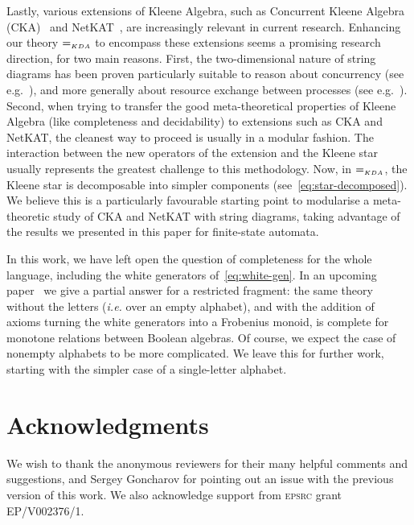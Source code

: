 \documentclass{lmcs}
\theoremstyle{plain}\newtheorem{satz}[thm]{Satz} %
\begin{document}
Lastly, various extensions of Kleene Algebra, such as Concurrent Kleene Algebra (CKA)~\cite{hoare2009concurrent,KappeB0Z18} and NetKAT~\cite{anderson2014netkat}, are increasingly relevant in current research. Enhancing our theory $=_{\scriptscriptstyle KDA}$ to encompass these extensions seems a promising research direction, for two main reasons. First, the two-dimensional nature of string diagrams  has been proven particularly suitable to reason about  concurrency (see e.g.~\cite{BonchiHPSZ19,Bruni2013}), and more generally about resource exchange between processes  (see e.g.~\cite{BonchiSZ17,pqp,jacobs2019causal,baez2015compositional,BPSZ-lics19}). Second, when trying to transfer the good meta-theoretical properties of Kleene Algebra (like completeness and decidability) to extensions such as CKA and NetKAT, the cleanest way to proceed is usually in a modular fashion. The interaction between the new operators of the extension and the Kleene star usually represents the greatest challenge to this methodology. Now, in $=_{\scriptscriptstyle KDA}$, the Kleene star is decomposable into simpler components (see~\eqref{eq:star-decomposed}). We believe this is a particularly favourable starting point to modularise a meta-theoretic study of CKA and NetKAT with string diagrams, taking advantage of the results we presented in this paper for finite-state automata.

In this work, we have left open the question of completeness for the whole language, including the white generators of~\eqref{eq:white-gen}.
%
In an upcoming paper~\cite{GPZSat2022} we give a partial answer for a restricted fragment: the same theory without the letters (\emph{i.e.} over an empty alphabet), and with the addition of axioms turning the white generators into a Frobenius monoid, is complete for monotone relations between Boolean algebras. Of course, we expect the case of nonempty alphabets to be more complicated. We leave this for further work, starting with the simpler case of a single-letter alphabet.

\section*{Acknowledgments}
  \noindent We wish to thank the anonymous reviewers for their many helpful comments and suggestions, and Sergey Goncharov for pointing out an issue with the previous version of this work. We also acknowledge support from \textsc{epsrc} grant EP/V002376/1.





\end{document}
